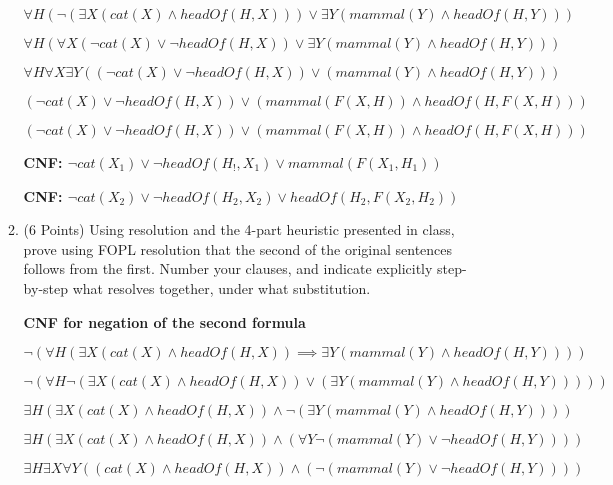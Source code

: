 \documentclass[letterpaper]{article}
\begin{document}
\begin{enumerate}
\begin{enumerate}
\begin{answer}
        	$\forall H (\neg (\exists X (cat(X) \land headOf(H,X))) \lor
        	\exists Y (mammal(Y) \land headOf(H, Y)))$
			
			$\forall H (\forall X (\neg cat(X) \lor \neg headOf(H,X)) \lor
        	\exists Y (mammal(Y) \land headOf(H, Y)))$
        	
        	$\forall H \forall X \exists Y((\neg cat(X) \lor \neg headOf(H,X))
        	\lor (mammal(Y) \land headOf(H, Y)))$
        	
        	$(\neg cat(X) \lor \neg headOf(H,X)) \lor (mammal(F(X, H))
        	\land headOf(H, F(X, H)))$
        	
        	$(\neg cat(X) \lor \neg headOf(H,X)) \lor (mammal(F(X, H)) \land
        	headOf(H, F(X, H)))$
        	\bigskip

			\textbf{CNF: $\neg cat(X_1) \lor \neg headOf(H_!,X_1) \lor mammal(F(X_1,
			H_1))$}
        	
        	\textbf{CNF: $\neg cat(X_2) \lor \neg headOf(H_2,X_2) \lor headOf(H_2,
        	F(X_2, H_2))$}
        	        	
        \end{answer}
        \bigskip 
        
        \item (6 Points) Using resolution and the 4-part heuristic presented in
        class, prove using FOPL resolution that the second of the original 
        sentences follows from the first. 
        Number your clauses, and indicate explicitly step-by-step what resolves together, 
        under what substitution.
        \begin{answer}
        	\textbf{CNF for negation of the second formula}
        	\bigskip
        	
        	$\neg (\forall H (\exists X (cat(X) \land headOf(H,X)) \implies \exists
        	Y (mammal(Y) \land headOf(H, Y))))$
        	
        	$\neg (\forall H \neg (\exists X (cat(X) \land headOf(H,X)) \lor
        	(\exists Y (mammal(Y) \land headOf(H, Y)))))$
        	
        	$\exists H (\exists X (cat(X) \land headOf(H,X)) \land
        	\neg (\exists Y (mammal(Y) \land headOf(H, Y))))$
        	
        	$\exists H (\exists X (cat(X) \land headOf(H,X)) \land
        	(\forall Y \neg (mammal(Y) \lor \neg headOf(H, Y))))$
        	
        	$\exists H \exists X \forall Y ((cat(X) \land headOf(H,X)) \land
        	(\neg (mammal(Y) \lor \neg headOf(H, Y))))$
        	

\end{answer}
\end{enumerate}
\end{enumerate}
\end{document}
